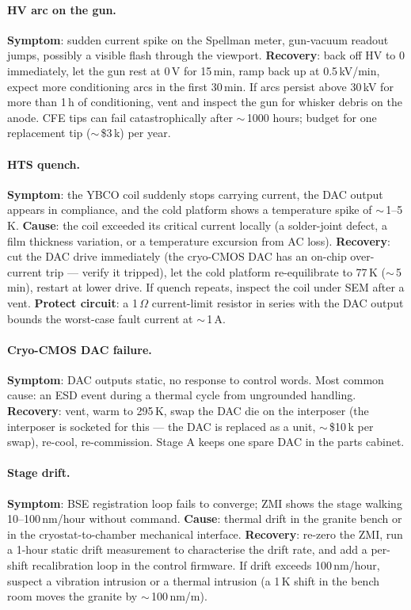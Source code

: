 \documentclass[11pt,letterpaper]{article}
\begin{document}
\paragraph{HV arc on the gun.} \textbf{Symptom}: sudden current spike on the Spellman meter, gun-vacuum readout jumps, possibly a visible flash through the viewport. \textbf{Recovery}: back off HV to 0 immediately, let the gun rest at 0\,V for 15\,min, ramp back up at 0.5\,kV/min, expect more conditioning arcs in the first 30\,min. If arcs persist above 30\,kV for more than 1\,h of conditioning, vent and inspect the gun for whisker debris on the anode. CFE tips can fail catastrophically after $\sim$\,1000 hours; budget for one replacement tip ($\sim$\,\$3\,k) per year.

\paragraph{HTS quench.} \textbf{Symptom}: the YBCO coil suddenly stops carrying current, the DAC output appears in compliance, and the cold platform shows a temperature spike of $\sim$\,1--5\,K. \textbf{Cause}: the coil exceeded its critical current locally (a solder-joint defect, a film thickness variation, or a temperature excursion from AC loss). \textbf{Recovery}: cut the DAC drive immediately (the cryo-CMOS DAC has an on-chip over-current trip --- verify it tripped), let the cold platform re-equilibrate to 77\,K ($\sim$\,5\,min), restart at lower drive. If quench repeats, inspect the coil under SEM after a vent. \textbf{Protect circuit}: a 1\,$\Omega$ current-limit resistor in series with the DAC output bounds the worst-case fault current at $\sim$\,1\,A.

\paragraph{Cryo-CMOS DAC failure.} \textbf{Symptom}: DAC outputs static, no response to control words. Most common cause: an ESD event during a thermal cycle from ungrounded handling. \textbf{Recovery}: vent, warm to 295\,K, swap the DAC die on the interposer (the interposer is socketed for this --- the DAC is replaced as a unit, $\sim$\,\$10\,k per swap), re-cool, re-commission. Stage A keeps one spare DAC in the parts cabinet.

\paragraph{Stage drift.} \textbf{Symptom}: BSE registration loop fails to converge; ZMI shows the stage walking 10--100\,nm/hour without command. \textbf{Cause}: thermal drift in the granite bench or in the cryostat-to-chamber mechanical interface. \textbf{Recovery}: re-zero the ZMI, run a 1-hour static drift measurement to characterise the drift rate, and add a per-shift recalibration loop in the control firmware. If drift exceeds 100\,nm/hour, suspect a vibration intrusion or a thermal intrusion (a 1\,K shift in the bench room moves the granite by $\sim$\,100\,nm/m).
\end{document}
